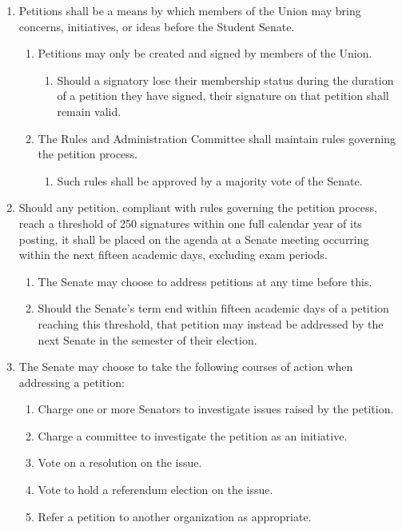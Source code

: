 
\begin{enumerate}
\item Petitions shall be a means by which members of the Union may bring concerns, initiatives, or ideas before the Student Senate.
  \begin{enumerate}
  \item Petitions may only be created and signed by members of the Union.
    \begin{enumerate}
    \item Should a signatory lose their membership status during the duration of a petition they have signed, their signature on that petition shall remain valid.
    \end{enumerate}
  \item The Rules and Administration Committee shall maintain rules governing the petition process.
    \begin{enumerate}
    \item Such rules shall be approved by a majority vote of the Senate.
    \end{enumerate}
  \end{enumerate}
\item Should any petition, compliant with rules governing the petition process, reach a threshold of 250 signatures within one full calendar year of its posting, it shall be placed on the agenda at a Senate meeting occurring within the next fifteen academic days, excluding exam periods.
  \begin{enumerate}
  \item The Senate may choose to address petitions at any time before this.
  \item Should the Senate’s term end within fifteen academic days of a petition reaching this threshold, that petition may instead be addressed by the next Senate in the semester of their election.
  \end{enumerate}
\item The Senate may choose to take the following courses of action when addressing a petition:
  \begin{enumerate}
  \item Charge one or more Senators to investigate issues raised by the petition.
  \item Charge a committee to investigate the petition as an initiative.
  \item Vote on a resolution on the issue.
  \item Vote to hold a referendum election on the issue.
  \item Refer a petition to another organization as appropriate.
  \end{enumerate}
\end{enumerate}

